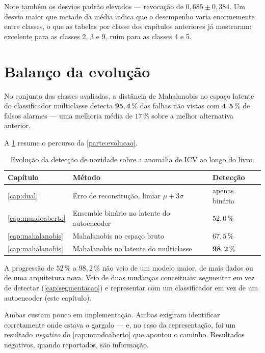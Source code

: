 Note também os desvios padrão elevados --- revocação de $0{,}685 \pm 0{,}384$. Um desvio
maior que metade da média indica que o desempenho varia enormemente entre classes, o que
as tabelas por classe dos capítulos anteriores já mostraram: excelente para as classes
2, 3 e 9, ruim para as classes 4 e 5.

\section{Balanço da evolução}

\begin{resultadochave}
No conjunto das classes avaliadas, a distância de Mahalanobis no espaço latente do
classificador multiclasse detecta $\bm{95{,}4\,\%}$ das falhas não vistas com
$\bm{4{,}5\,\%}$ de falsos alarmes --- uma melhoria média de $17\,\%$ sobre a melhor
alternativa anterior.
\end{resultadochave}

A \cref{tab:mahal-evolucao} resume o percurso da \cref{parte:evolucao}.

\begin{table}[htbp]
\centering
\caption{Evolução da detecção de novidade sobre a anomalia de ICV ao longo do livro.}
\label{tab:mahal-evolucao}
\small
\begin{tabular}{lll}
\toprule
\textbf{Capítulo} & \textbf{Método} & \textbf{Detecção} \\
\midrule
\cref{cap:dual}         & Erro de reconstrução, limiar $\mu + 3\sigma$ & apenas binária \\
\cref{cap:mundoaberto}  & Ensemble binário no latente do autoencoder   & $52{,}0\,\%$ \\
\cref{cap:mahalanobis}  & Mahalanobis no espaço bruto                  & $67{,}5\,\%$ \\
\cref{cap:mahalanobis}  & Mahalanobis no latente do multiclasse        & $\bm{98{,}2\,\%}$ \\
\bottomrule
\end{tabular}
\end{table}

\begin{destaque}
A progressão de $52\,\%$ a $98{,}2\,\%$ não veio de um modelo maior, de mais dados ou de
uma arquitetura nova. Veio de duas mudanças conceituais: segmentar em vez de detectar
(\cref{cap:segmentacao}) e representar com um classificador em vez de um autoencoder
(este capítulo).

Ambas custam pouco em implementação. Ambas exigiram identificar corretamente onde estava
o gargalo --- e, no caso da representação, foi um resultado \emph{negativo} do
\cref{cap:mundoaberto} que apontou o caminho. Resultados negativos, quando reportados,
são informação.
\end{destaque}

